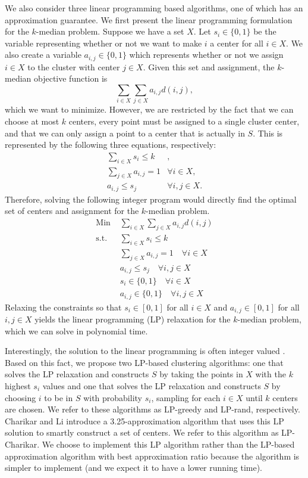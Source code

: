 \documentclass[conference, 10pt, final]{IEEEtran}
\begin{document}
We also consider three linear programming based algorithms, one of which has an approximation guarantee. We first present the linear programming formulation for the $k$-median problem. Suppose we have a set $X$. Let $s_i \in \{0,1\}$ be the variable representing whether or not we want to make $i$ a center for all $i \in X$. We also create a variable $a_{i,j} \in \{0, 1\}$ which represents whether or not we assign $i \in X$ to the cluster with center $j \in X$. Given this set and assignment, the $k$-median objective function is 
\begin{equation}
\sum_{i \in X} \sum_{j \in X} a_{i,j} d(i,j), 
\end{equation}
which we want to minimize. However, we are restricted by the fact that we can choose at most $k$ centers, every point must be assigned to a single cluster center, and that we can only assign a point to a center that is actually in $S$. This is represented by the following three equations, respectively:
\begin{eqnarray}
\sum_{i \in X} s_i   \leq k & ,\\
\sum_{j \in X} a_{i,j}  = 1 & \forall i \in X, \\
a_{i,j}   \leq s_j & \forall i, j \in X.
\end{eqnarray}
Therefore, solving the following integer program would directly find the optimal set of centers and assignment for the $k$-median problem.
\begin{eqnarray}
\text{Min } & \sum_{i \in X} \sum_{j \in X} a_{i,j} d(i,j) \\
\text{s.t. } & \sum_{i \in X} s_i   \leq k  \\
& \sum_{j \in X} a_{i,j}  = 1 \quad \forall i \in X \\
& a_{i,j}   \leq s_j \quad \forall i, j \in X \\
& s_i \in \{0,1\} \quad \forall i \in X \\
& a_{i,j} \in \{0,1\} \quad \forall i, j \in X
\end{eqnarray}
Relaxing the constraints so that $s_i \in [0,1]$ for all $i \in X$ and $a_{i,j} \in [0,1]$ for all $i,j \in X$ yields the linear programming (LP) relaxation for the $k$-median problem, which we can solve in polynomial time.

Interestingly, the solution to the linear programming is often integer valued \cite{Nagarajan}. Based on this fact, we propose two LP-based clustering algorithms: one that solves the LP relaxation and constructs $S$ by taking the points in $X$ with the $k$ highest $s_i$ values and one that solves the LP relaxation and constructs $S$ by choosing $i$ to be in $S$ with probability $s_i$, sampling for each $i \in X$ until $k$ centers are chosen. We refer to these algorithms as LP-greedy and LP-rand, respectively.
Charikar and Li \cite{Charikar} introduce a 3.25-approximation algorithm that uses this LP solution to smartly construct a set of centers. We refer to this algorithm as LP-Charikar. We choose to implement this LP algorithm rather than the LP-based approximation algorithm with best approximation ratio because the algorithm is simpler to implement (and we expect it to have a lower running time). 
\end{document}

